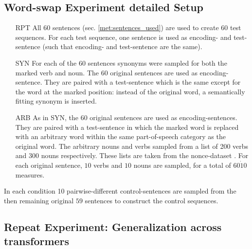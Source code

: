 \subsection{Word-swap Experiment detailed Setup}\label{app:word_swap_setup}

\begin{itemize}
    \item[RPT] All 60 sentences (sec. \ref{met:sentences_used}) are used to create 60 test sequences. For each test sequence, one sentence is used as encoding- and test-sentence (such that encoding- and test-sentence are the same).
    \item[SYN] For each of the 60 sentences synonyms were sampled for both the marked verb and noun. The 60 original sentences are used as encoding-sentence. They are paired with a test-sentence which is the same except for the word at the marked position: instead of the original word, a semantically fitting synonym is inserted.
    \item[ARB] As in SYN, the 60 original sentences are used as encoding-sentences. They are paired with a test-sentence in which the marked word is replaced with an arbitrary word within the same part-of-speech category as the original word. The arbitrary nouns and verbs sampled from a list of 200 verbs and 300 nouns respectively. These lists are taken from the nonce-dataset \cite{linzen_assessing_2016}. For each original sentence, $10$ verbs and $10$ nouns are sampled, for a total of $60 \dot 10$ measures.
\end{itemize}
In each condition 10 pairwise-different control-sentences are sampled from the then remaining original $59$ sentences to construct the control sequences.


\subsection{Repeat Experiment: Generalization across transformers}

